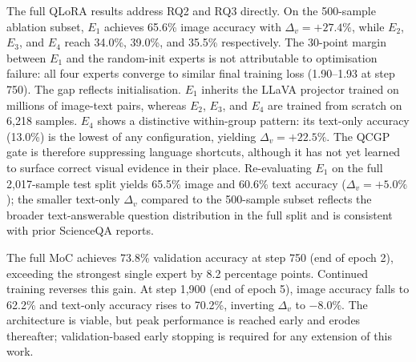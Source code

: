 \documentclass{article}
\begin{document}
The full QLoRA results address RQ2 and RQ3 directly. On the 500-sample ablation subset, $E_1$ achieves 65.6\% image accuracy with $\Delta_v = +27.4\%$, while $E_2$, $E_3$, and $E_4$ reach 34.0\%, 39.0\%, and 35.5\% respectively. The 30-point margin between $E_1$ and the random-init experts is not attributable to optimisation failure: all four experts converge to similar final training loss (1.90--1.93 at step 750). The gap reflects initialisation. $E_1$ inherits the LLaVA projector trained on millions of image-text pairs, whereas $E_2$, $E_3$, and $E_4$ are trained from scratch on 6{,}218 samples. $E_4$ shows a distinctive within-group pattern: its text-only accuracy (13.0\%) is the lowest of any configuration, yielding $\Delta_v = +22.5\%$. The QCGP gate is therefore suppressing language shortcuts, although it has not yet learned to surface correct visual evidence in their place. Re-evaluating $E_1$ on the full 2{,}017-sample test split yields 65.5\% image and 60.6\% text accuracy ($\Delta_v = +5.0\%$); the smaller text-only $\Delta_v$ compared to the 500-sample subset reflects the broader text-answerable question distribution in the full split and is consistent with prior ScienceQA reports.

The full MoC achieves 73.8\% validation accuracy at step 750 (end of epoch 2), exceeding the strongest single expert by 8.2 percentage points. Continued training reverses this gain. At step 1{,}900 (end of epoch 5), image accuracy falls to 62.2\% and text-only accuracy rises to 70.2\%, inverting $\Delta_v$ to $-8.0\%$. The architecture is viable, but peak performance is reached early and erodes thereafter; validation-based early stopping is required for any extension of this work.
\end{document}
